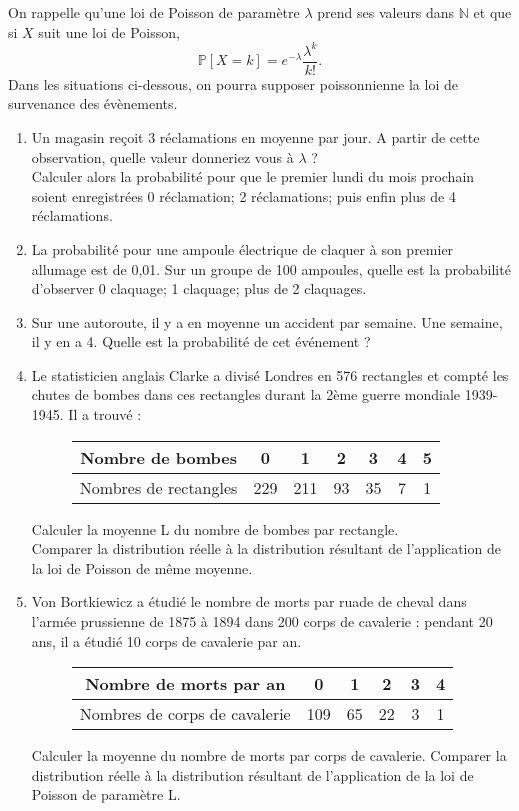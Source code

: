 \documentclass[solutions]{exercices}
\begin{document}
\begin{exercice}
On rappelle qu'une loi de Poisson de paramètre $\lambda$ prend ses valeurs dans $\mathbb{N}$ et que si $X$ suit une loi de Poisson,
$$\mathbb{P}[X=k]=e^{-\lambda}\frac{\lambda^k}{k!} .$$
Dans les situations ci-dessous, on pourra supposer poissonnienne la loi de survenance des évènements.
\begin{enumerate}
\item Un magasin reçoit 3 réclamations en moyenne par jour. A partir de cette observation, quelle valeur donneriez vous à $\lambda$ ?\\
Calculer alors la probabilité pour que le premier lundi du mois prochain soient enregistrées 0 réclamation; 2 réclamations; puis enfin plus de 4 réclamations.
\item La probabilité pour une ampoule électrique de claquer à son premier allumage est de 0,01. Sur un groupe de 100 ampoules, quelle est la probabilité d'observer 0 claquage; 1 claquage; plus de 2 claquages.
\item Sur une autoroute, il y a en moyenne un accident par semaine. Une semaine, il y en a 4.
Quelle est la probabilité de cet événement ?
\item Le statisticien anglais Clarke a divisé Londres en 576 rectangles et compté les chutes de bombes dans ces rectangles durant la 2ème guerre mondiale 1939-1945.
Il a trouvé :
\begin{figure}[h]
\centering
\begin{tabular}{|c|c|c|c|c|c|c|}
\hline
Nombre de bombes & 0 & 1 & 2 & 3 & 4 & 5 \\
\hline
Nombres de rectangles & 229 & 211 & 93 & 35 & 7 & 1 \\
\hline
\end{tabular}
\end{figure}
Calculer la moyenne L du nombre de bombes par rectangle. \\
Comparer la distribution réelle à la distribution résultant de l'application de la loi de Poisson de même moyenne.

\item Von Bortkiewicz a étudié le nombre de morts par ruade de cheval dans l'armée prussienne de 1875 à 1894 dans 200 corps de cavalerie : pendant 20 ans, il a étudié 10 corps de cavalerie par an.
\begin{figure}[h]
\centering
\begin{tabular}{|c|c|c|c|c|c|}
\hline
Nombre de morts par an & 0 & 1 & 2 & 3 & 4 \\
\hline
Nombres de corps de cavalerie & 109 & 65 & 22 & 3 & 1  \\
\hline
\end{tabular}
\end{figure}
Calculer la moyenne du nombre de morts par corps de cavalerie. Comparer la distribution réelle à la distribution résultant de l'application de la loi de Poisson de paramètre L.
\end{enumerate}
\end{exercice}
\end{document}
